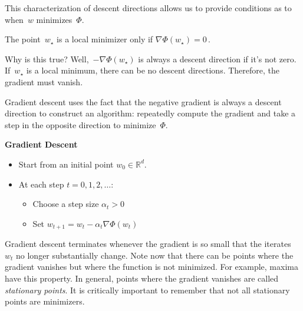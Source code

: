 \documentclass{tufte-book}
\begin{document}
This characterization of descent directions allows us to provide
conditions as to when~\(w\) minimizes~\(\Phi\).

\begin{Proposition}

The point~\(w_\star\) is a local minimizer only if
\(\nabla \Phi(w_\star) = 0\,.\)

\end{Proposition}

Why is this true? Well,~\(-\nabla \Phi(w_\star)\) is always a descent
direction if it's not zero. If~\(w_\star\) is a local minimum, there can
be no descent directions. Therefore, the gradient must vanish.

Gradient descent uses the fact that the negative gradient is always a
descent direction to construct an algorithm: repeatedly compute the
gradient and take a step in the opposite direction to minimize~\(\Phi\).

\begin{Algorithm}

\textbf{Gradient Descent}

\begin{itemize}
\tightlist
\item
  Start from an initial point \(w_0 \in \mathbb{R}^d.\)
\item
  At each step \(t=0,1,2,\dots\):

  \begin{itemize}
  \tightlist
  \item
    Choose a step size \(\alpha_t>0\)
  \item
    Set \(w_{t+1} = w_t - \alpha_t \nabla \Phi(w_t)\)
  \end{itemize}
\end{itemize}

\end{Algorithm}

Gradient descent terminates whenever the gradient is so small that the
iterates~\(w_t\) no longer substantially change. Note now that there can
be points where the gradient vanishes but where the function is not
minimized. For example, maxima have this property. In general, points
where the gradient vanishes are called \emph{stationary points}. It is
critically important to remember that not all stationary points are
minimizers.
\end{document}
